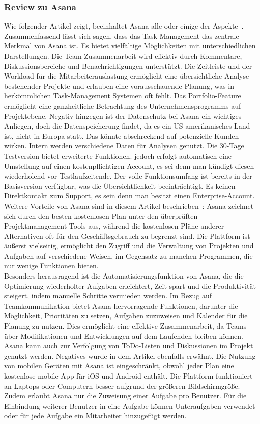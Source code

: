 \documentclass[sigconf, nonacm]{acmart}
\begin{document}
\subsubsection{Review zu Asana}
Wie folgender Artikel zeigt, beeinhaltet Asana alle oder einige der Aspekte~\cite{venzmer_projektmanagement_2020}. Zusammenfassend lässt sich sagen, dass das Task-Management das zentrale Merkmal von Asana ist. Es bietet vielfältige Möglichkeiten mit unterschiedlichen Darstellungen. Die Team-Zusammenarbeit wird effektiv durch Kommentare, Diskussionsbereiche und Benachrichtigungen unterstützt. Die Zeitleiste und der Workload für die Mitarbeiterauslastung ermöglicht eine übersichtliche Analyse bestehender Projekte und erlauben eine vorausschauende Planung, was in herkömmlichen Task-Management Systemen oft fehlt. Das Portfolio-Feature ermöglicht eine ganzheitliche Betrachtung des Unternehmensprogramms auf Projektebene.
Negativ hingegen ist der Datenschutz bei Asana ein wichtiges Anliegen, doch die Datenspeicherung findet, da es ein US-amerikanisches Land ist, nicht in Europa statt. Das könnte abschreckend auf potenzielle Kunden wirken. Intern werden verschiedene Daten für Analysen genutzt. Die 30-Tage Testversion bietet erweiterte Funktionen. jedoch erfolgt automatisch eine Umstellung auf einen kostenpflichtigen Account, es sei denn man kündigt diesen wiederholend vor Testlaufzeitende. Der volle Funktionsumfang ist bereits in der Basisversion verfügbar, was die Übersichtlichkeit beeinträchtigt. Es keinen Direktkontakt zum Support, es sein denn man besitzt einen Enterprise-Account.\\
Weitere Vorteile von Asana sind in diesem Artikel beschrieben~\cite{noauthor_asana_nodate}:
Asana zeichnet sich durch den besten kostenlosen Plan unter den überprüften Projektmanagement-Tools aus, während die kostenlosen Pläne anderer Alternativen oft für den Geschäftsgebrauch zu begrenzt sind. Die Plattform ist äußerst vielseitig, ermöglicht den Zugriff und die Verwaltung von Projekten und Aufgaben auf verschiedene Weisen, im Gegensatz zu manchen Programmen, die nur wenige Funktionen bieten.\\
Besonders herausragend ist die Automatisierungsfunktion von Asana, die die Optimierung wiederholter Aufgaben erleichtert, Zeit spart und die Produktivität steigert, indem manuelle Schritte vermieden werden.
Im Bezug auf Teamkommunikation bietet Asana hervorragende Funktionen, darunter die Möglichkeit, Prioritäten zu setzen, Aufgaben zuzuweisen und Kalender für die Planung zu nutzen. Dies ermöglicht eine effektive Zusammenarbeit, da Teams über Modifikationen und Entwicklungen auf dem Laufenden bleiben können. Asana kann auch zur Verfolgung von ToDo-Listen und Diskussionen im Projekt genutzt werden.
Negatives wurde in dem Artikel ebenfalls erwähnt. Die Nutzung von mobilen Geräten mit Asana ist eingeschränkt, obwohl jeder Plan eine kostenlose mobile App für iOS und Android enthält. Die Plattform funktioniert an Laptops oder Computern besser aufgrund der größeren Bildschirmgröße. Zudem erlaubt Asana nur die Zuweisung einer Aufgabe pro Benutzer. Für die Einbindung weiterer Benutzer in eine Aufgabe können Unteraufgaben verwendet oder für jede Aufgabe ein Mitarbeiter hinzugefügt werden.
\end{document}
